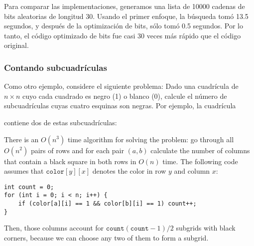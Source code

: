 Para comparar las implementaciones, generamos
una lista de 10000 cadenas de bits aleatorias de longitud 30.
Usando el primer enfoque, la búsqueda tomó
13.5 segundos, y después de la optimización de bits,
sólo tomó 0.5 segundos.
Por lo tanto, el código optimizado de bits fue casi
30 veces más rápido que el código original.

\subsubsection{Contando subcuadrículas}

Como otro ejemplo, considere el
siguiente problema:
Dado una cuadrícula de $n \times n$ cuyo
cada cuadrado es negro (1) o blanco (0),
calcule el número de subcuadrículas
cuyas cuatro esquinas son negras.
Por ejemplo, la cuadrícula
\begin{center}
\end{center}
contiene dos de estas subcuadrículas:
\begin{center}
\end{center}

There is an $O(n^3)$ time algorithm for solving the problem:
go through all $O(n^2)$ pairs of rows and for each pair
$(a,b)$ calculate the number of columns that contain a black
square in both rows in $O(n)$ time.
The following code assumes that $\texttt{color}[y][x]$
denotes the color in row $y$ and column $x$:
\begin{lstlisting}
int count = 0;
for (int i = 0; i < n; i++) {
    if (color[a][i] == 1 && color[b][i] == 1) count++;
}
\end{lstlisting}
Then, those columns
account for $\texttt{count}(\texttt{count}-1)/2$ subgrids with black corners,
because we can choose any two of them to form a subgrid.

